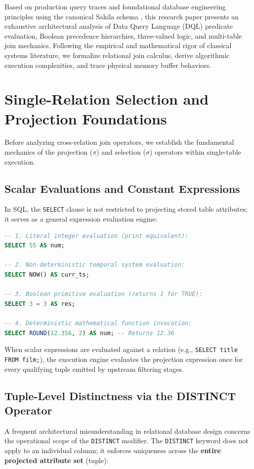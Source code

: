 \documentclass[10pt,twocolumn,letterpaper]{article}
\begin{document}
Based on production query traces and foundational database engineering principles using the canonical Sakila schema \cite{sakila2024}, this research paper presents an exhaustive architectural analysis of Data Query Language (DQL) predicate evaluation, Boolean precedence hierarchies, three-valued logic, and multi-table join mechanics. Following the empirical and mathematical rigor of classical systems literature, we formalize relational join calculus, derive algorithmic execution complexities, and trace physical memory buffer behaviors.

\section{Single-Relation Selection and Projection Foundations}
\label{sec:projection}

Before analyzing cross-relation join operators, we establish the fundamental mechanics of the projection ($\pi$) and selection ($\sigma$) operators within single-table execution.

\subsection{Scalar Evaluations and Constant Expressions}
In SQL, the \texttt{SELECT} clause is not restricted to projecting stored table attributes; it serves as a general expression evaluation engine:
\begin{lstlisting}[language=SQL]
-- 1. Literal integer evaluation (print equivalent):
SELECT 55 AS num;

-- 2. Non-deterministic temporal system evaluation:
SELECT NOW() AS curr_ts;

-- 3. Boolean primitive evaluation (returns 1 for TRUE):
SELECT 3 = 3 AS res;

-- 4. Deterministic mathematical function invocation:
SELECT ROUND(12.356, 2) AS num; -- Returns 12.36
\end{lstlisting}

When scalar expressions are evaluated against a relation (e.g., \texttt{SELECT title FROM film;}), the execution engine evaluates the projection expression once for every qualifying tuple emitted by upstream filtering stages.

\subsection{Tuple-Level Distinctness via the DISTINCT Operator}
A frequent architectural misunderstanding in relational database design concerns the operational scope of the \texttt{DISTINCT} modifier. The \texttt{DISTINCT} keyword does not apply to an individual column; it enforces uniqueness across the \textbf{entire projected attribute set} (tuple):
\end{document}
